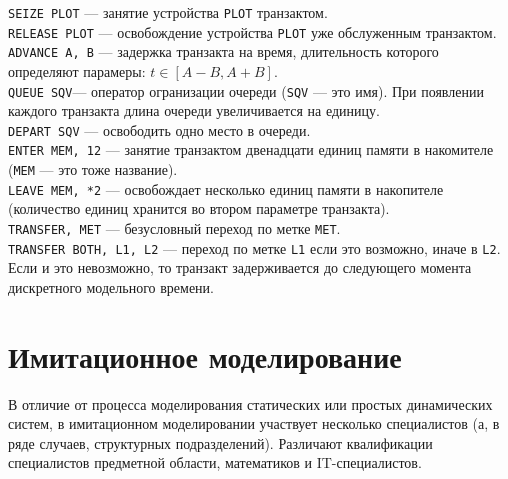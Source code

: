 \documentclass[12pt]{article}
\begin{document}
\texttt{SEIZE PLOT} --- занятие устройства \texttt{PLOT} транзактом.\\

\texttt{RELEASE PLOT} --- освобождение устройства \texttt{PLOT} уже обслуженным транзактом.
\\

\texttt{ADVANCE A, B} --- задержка транзакта на время, длительность которого определяют парамеры: $t \in [A - B, A + B]$.\\

\texttt{QUEUE SQV}--- оператор огранизации очереди (\texttt{SQV} --- это имя). При появлении каждого транзакта длина очереди увеличивается на единицу.\\

\texttt{DEPART SQV} --- освободить одно место в очереди.\\

\texttt{ENTER MEM, 12} --- занятие транзактом двенадцати единиц памяти в накомителе (\texttt{MEM} --- это тоже название).\\

\texttt{LEAVE MEM, *2} --- освобождает несколько единиц памяти в накопителе (количество единиц хранится во втором параметре транзакта).\\

\texttt{TRANSFER, MET} --- безусловный переход по метке \texttt{MET}.\\

\texttt{TRANSFER BOTH, L1, L2} --- переход по метке \texttt{L1} если это возможно, иначе в \texttt{L2}. Если и это невозможно, то транзакт задерживается до следующего момента дискретного модельного  времени.

\newpage
\section{Имитационное моделирование}
В отличие от процесса моделирования статических или простых динамических систем, в имитационном моделировании участвует несколько специалистов (а, в ряде случаев, структурных подразделений). Различают квалификации специалистов предметной области, математиков и IT-специалистов.\\
\end{document}
